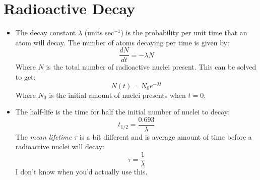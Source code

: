 \documentclass[letter]{article}
\begin{document}
\section{Radioactive Decay}
\begin{itemize}
\item The decay constant $\lambda$ (units sec$^{-1}$) is the probability
  per unit time that an atom will decay. The number of atoms decaying
  per time is given by:
  \begin{equation*}
    \frac{dN}{dt} = -\lambda{}N
  \end{equation*}
Where $N$ is the total number of radioactive nuclei
present. This can be solved to get:
\begin{equation*}
  N(t) = N_0e^{-\lambda{}t}
\end{equation*}
Where $N_0$ is the initial amount of nuclei presents when
$t=0$.~\cite[pp. 161]{krane}
\item The half-life is the time for half the initial number of nuclei
  to decay:
  \begin{equation*}
    t_{1/2} = \frac{0.693}{\lambda}
  \end{equation*}
The \textit{mean lifetime} $\tau$ is a bit different and is average
amount of time before a radioactive nuclei will decay:
\begin{equation*}
  \tau = \frac{1}{\lambda}
\end{equation*}
I don't know when you'd actually use this.~\cite[pp. 161]{krane}
\end{itemize}




\end{document}
